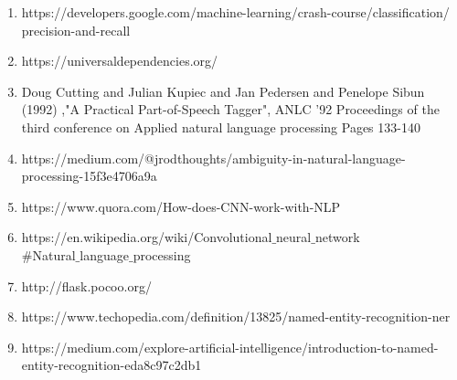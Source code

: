 \documentclass[12pt,a4paper]{article}
\begin{document}
\begin {center}
\begin{enumerate}
\item https://developers.google.com/machine-learning/crash-course/classification/\\precision-and-recall

\item https://universaldependencies.org/

\item Doug Cutting and Julian Kupiec and Jan Pedersen and Penelope Sibun (1992) ,"A Practical Part-of-Speech Tagger", ANLC '92 Proceedings of the third conference on Applied natural language processing
Pages 133-140

\item https://medium.com/@jrodthoughts/ambiguity-in-natural-language-processing-15f3e4706a9a

\item https://www.quora.com/How-does-CNN-work-with-NLP

\item https://en.wikipedia.org/wiki/Convolutional$\_$neural$\_$network\\$\#$Natural$\_$language$\_$processing

\item http://flask.pocoo.org/

\item https://www.techopedia.com/definition/13825/named-entity-recognition-ner

\item https://medium.com/explore-artificial-intelligence/introduction-to-named-entity-recognition-eda8c97c2db1

\end{enumerate} 
\end{center}
\end{document}
